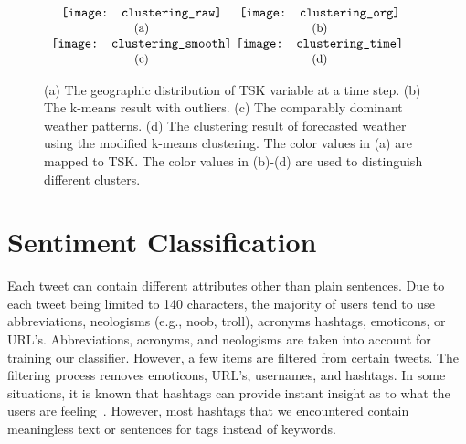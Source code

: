 \begin{figure}[t]
\begin{center}
$\begin{array}{c@{\hspace{0.01\linewidth}}c}
\texttt{[image: clustering\_raw]} &
\texttt{[image: clustering\_org]}
\\
\mbox{\small{(a)}} & \mbox{\small{(b)}}
\\
\texttt{[image: clustering\_smooth]} &
\texttt{[image: clustering\_time]}
\\
\mbox{\small{(c)}} & \mbox{\small{(d)}}
\end{array}$
\end{center}
\vspace{-.1in}
\caption{(a) The geographic distribution of TSK variable at a time step. (b) The k-means result with outliers. (c) The comparably dominant weather patterns. (d) The clustering result of forecasted weather using the modified k-means clustering. The color values in (a) are mapped to TSK. The color values in (b)-(d) are used to distinguish different clusters.}
\label{fig:clustering}
\end{figure}

\section{Sentiment Classification}
\label{sec:senti}

Each tweet can contain different attributes other than plain sentences. Due to each tweet being limited to 140 characters, the majority of users tend to use abbreviations, neologisms (e.g., noob, troll), acronyms hashtags, emoticons, or URL's. Abbreviations, acronyms, and neologisms are taken into account for training our classifier. However, a few items are filtered from certain tweets. The filtering process removes emoticons, URL's, usernames, and hashtags. In some situations, it is known that hashtags can provide instant insight as to what the users are feeling~\cite{agarwal2011sentiment}. However, most hashtags that we encountered contain meaningless text or sentences for tags instead of keywords.

